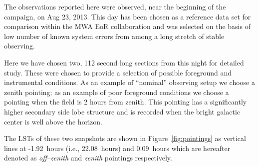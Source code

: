 \documentclass[preprint2,iop,numberedappendix]{emulateapj}
\begin{document}
The observations reported here were observed, near the beginning of the campaign, on Aug 23, 2013. This day has been chosen as a reference data set for comparison within the MWA EoR collaboration and was selected on the basis of low number of known system errors from among a long stretch of stable observing.  

Here we have chosen two, 112 second long sections from this night for detailed study. These were chosen to provide a selection of possible foreground and instrumental conditions. As an example of ``nominal'' observing setup we choose a zenith pointing; as an example of poor foreground conditions we choose a pointing when the field is 2 hours from zenith. This pointing has a significantly higher secondary side lobe structure and is recorded when the bright galactic center is well above the horizon. 

The LSTs of these two snapshots are shown in Figure~\ref{fig:pointings} as vertical lines at -1.92~hours (i.e., 22.08~hours) and 0.09~hours which are hereafter denoted as {\it off--zenith} and {\it zenith} pointings respectively. %
\end{document}
